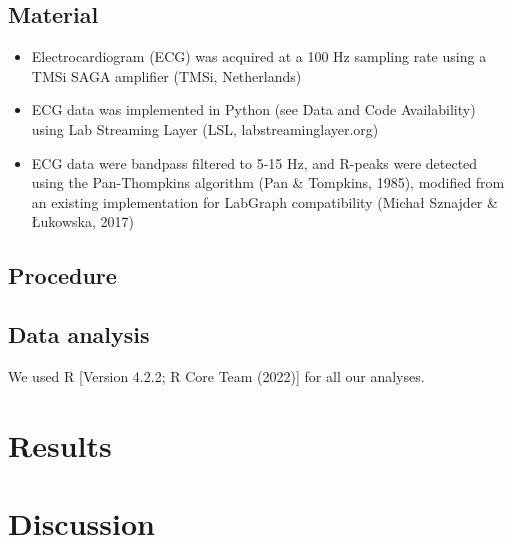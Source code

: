 \documentclass[
  man]{apa6}
\begin{document}
\hypertarget{material}{%
\subsection{Material}\label{material}}

\begin{itemize}
\item
  Electrocardiogram (ECG) was acquired at a 100 Hz sampling rate using a TMSi SAGA amplifier (TMSi, Netherlands)
\item
  ECG data was implemented in Python (see Data and Code Availability) using Lab Streaming Layer (LSL, labstreaminglayer.org)
\item
  ECG data were bandpass filtered to 5-15 Hz, and R-peaks were detected using the Pan-Thompkins algorithm (Pan \& Tompkins, 1985), modified from an existing implementation for LabGraph compatibility (Michał Sznajder \& Łukowska, 2017)
\end{itemize}

\hypertarget{procedure}{%
\subsection{Procedure}\label{procedure}}

\hypertarget{data-analysis}{%
\subsection{Data analysis}\label{data-analysis}}

We used R {[}Version 4.2.2; R Core Team (2022){]} for all our analyses.

\hypertarget{results}{%
\section{Results}\label{results}}

\hypertarget{discussion}{%
\section{Discussion}\label{discussion}}
\end{document}
